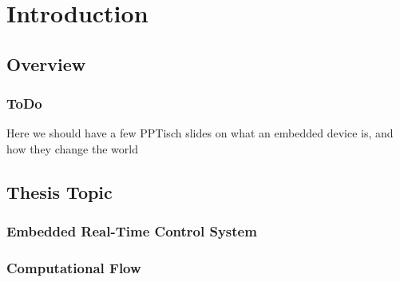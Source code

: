 \section{Introduction}%


\subsection{Overview}%


\begin{frame}
    \frametitle{ToDo}
    \centering
    \Huge
    Here we should have a few PPTisch slides on what an embedded device is, and how they change the world
\end{frame}


\subsection{Thesis Topic}%


\begin{frame}
    \frametitle{Embedded Real-Time Control System}
    \begin{figure}[h]
        \centering
        \only<2>{}%
        \only<3>{}%
        \only<8>{}%
        \only<9>{}%
    \end{figure}
\end{frame}


\begin{frame}
    \frametitle{Computational Flow}
    \begin{figure}[h]
        \centering
    \end{figure}
\end{frame}

